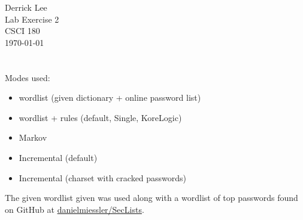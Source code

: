 \documentclass[12pt]{exam}
\begin{document}
\noindent
Derrick Lee\\
Lab Exercise 2\\
CSCI 180\\
\today\\

\section{}

Modes used:
\begin{itemize}[noitemsep]
    \item wordlist (given dictionary + online password list)
    \item wordlist + rules (default, Single, KoreLogic)
    \item Markov
    \item Incremental (default)
    \item Incremental (charset with cracked passwords)
\end{itemize}

The given wordlist given was used along with a wordlist of top passwords found
on GitHub at \href{https://github.com/danielmiessler/SecLists/tree/master/Passwords/Common-Credentials}{danielmiessler/SecLists}.

\vspace*{.21in}
\end{document}
